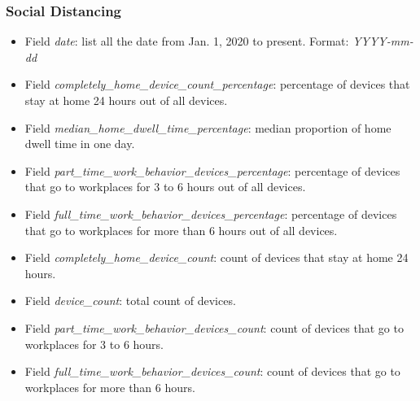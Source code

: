 \documentclass[11pt]{article}
\numberwithin{equation}{section}
\numberwithin{table}{section}
\numberwithin{figure}{section}
\begin{document}
\subsubsection{Social Distancing}
\begin{itemize}
	\item Field \textit{date}: list all the date from Jan. 1, 2020 to present. Format: \textit{YYYY-mm-dd}
	\item Field \textit{completely\_home\_device\_count\_percentage}: percentage of devices that stay at home 24 hours out of all devices.
	\item Field \textit{median\_home\_dwell\_time\_percentage}: median proportion of home dwell time in one day.
	\item Field \textit{part\_time\_work\_behavior\_devices\_percentage}: percentage of devices that go to workplaces for 3 to 6 hours out of all devices.
	\item Field \textit{full\_time\_work\_behavior\_devices\_percentage}: percentage of devices that go to workplaces for more than 6 hours out of all devices.
	\item Field \textit{completely\_home\_device\_count}: count of devices that stay at home 24 hours.
	\item Field \textit{device\_count}: total count of devices.
	\item Field \textit{part\_time\_work\_behavior\_devices\_count}: count of devices that go to workplaces for 3 to 6 hours.
	\item Field \textit{full\_time\_work\_behavior\_devices\_count}: count of devices that go to workplaces for more than 6 hours.
\end{itemize}
\end{document}
